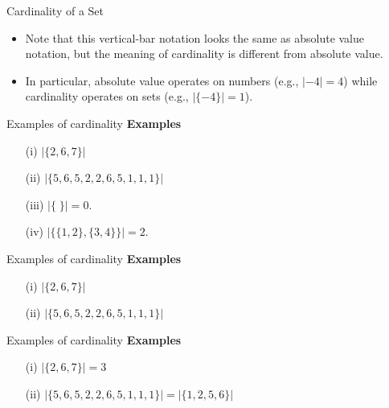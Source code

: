 \documentclass[]{article}
\begin{document}

{Cardinality of a Set}
\Large
\vspace{-1cm}
\begin{itemize}

\item Note that this vertical-bar notation looks the same as absolute value notation, 
but the meaning of cardinality is different from absolute value.

\item In particular, absolute value operates on numbers (e.g., $|-4| = 4$) 
while cardinality operates on sets (e.g., $|\{-4\}| = 1$).
\end{itemize}


{Examples of cardinality}
\LARGE
\vspace{-1cm}
\textbf{Examples}
\begin{itemize}
\item[(i)] $|\{2,6,7\}|$
\item[(ii)] $|\{5,6,5,2,2,6,5,1,1,1\}|$
\item[(iii)] $|\{ \;\}| = 0$. %
\item[(iv)] $|\{\{1,2\},\{3,4\}\}| = 2$. 
\end{itemize}



{Examples of cardinality}
\LARGE
\vspace{-1cm}
\textbf{Examples}
\begin{itemize}
\item[(i)] $|\{2,6,7\}| $
\vspace{2cm}
\item[(ii)] $|\{5,6,5,2,2,6,5,1,1,1\}| $
\end{itemize}



{Examples of cardinality}
\LARGE
\vspace{-1cm}
\textbf{Examples}
\begin{itemize}
\item[(i)] $|\{2,6,7\}| = 3 $
\vspace{2cm}
\item[(ii)] $|\{5,6,5,2,2,6,5,1,1,1\}| = |\{1,2,5,6\}| $
\end{itemize}
\end{document}
